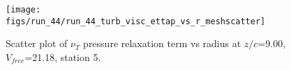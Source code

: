 \begin{figure}[H]
\centering
\texttt{[image: figs/run\_44/run\_44\_turb\_visc\_ettap\_vs\_r\_meshscatter]}
\caption{Scatter plot of $\nu_T$ pressure relaxation term vs radius at $z/c$=9.00, $V_{free}$=21.18, station 5.}
\label{fig:run_44_turb_visc_ettap_vs_r_meshscatter}
\end{figure}


